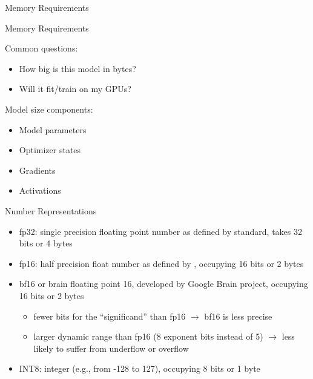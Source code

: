 \documentclass[11pt,compress,t,notes=noshow, xcolor=table]{beamer}
\begin{document}
\begin{vbframe}{Memory Requirements}
\end{vbframe}
\begin{vbframe}{Memory Requirements}

\vfill

Common questions: \newline

\begin{itemize}
 	\item How big is this model in bytes?
	\item Will it fit/train on my GPUs?
\end{itemize}

\vskip8mm

Model size components: \newline

\begin{itemize}
 	\item Model parameters
	\item Optimizer states
	\item Gradients
	\item Activations
\end{itemize}

\vfill

\end{vbframe}


\begin{vbframe}{Number Representations}

\vfill

\begin{itemize}
 	\item fp32: single precision floating point number as defined by  standard, takes 32 bits or 4 bytes
 	\item fp16: half precision float number as defined
          by , occupying 16 bits or 2 bytes 
    \item bf16 or brain floating point 16, developed by
 	Google Brain project, occupying 16 bits or 2 bytes
\begin{itemize}
        \item fewer bits for the ``significand'' than fp16
          $\rightarrow$ bf16 is less precise
        \item larger dynamic range than fp16
 	(8 exponent bits instead of 5)
$\rightarrow$ less likely to
 	suffer from underflow or overflow 
\end{itemize}
	\item INT8: integer (e.g., from -128 to 127), occupying 8 bits or 1 byte
\end{itemize}

\vfill

\end{vbframe}
\end{document}
